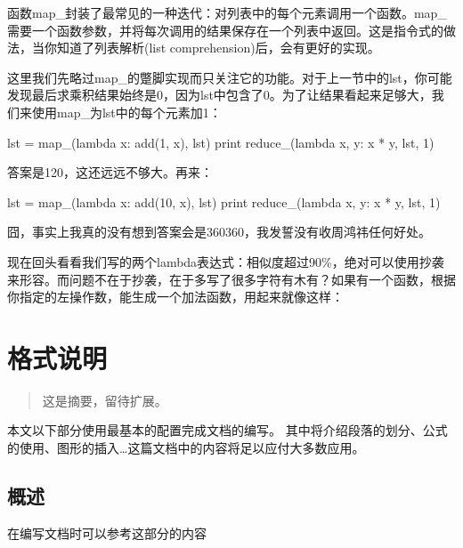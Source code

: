 \documentclass[12pt,a4paper]{report}
\begin{document}
函数map\_封装了最常见的一种迭代：对列表中的每个元素调用一个函数。map\_需要一个函数参数，并将每次调用的结果保存在一个列表中返回。这是指令式的做法，当你知道了列表解析(list comprehension)后，会有更好的实现。

这里我们先略过map\_的蹩脚实现而只关注它的功能。对于上一节中的lst，你可能发现最后求乘积结果始终是0，因为lst中包含了0。为了让结果看起来足够大，我们来使用map\_为lst中的每个元素加1：
\begin{python}[moreemph={[4]42},caption={},label=ex1]
lst = map_(lambda x: add(1, x), lst)
print reduce_(lambda x, y: x * y, lst, 1)
\end{python}

答案是120，这还远远不够大。再来：
\begin{python}[moreemph={[4]42},caption={},label=ex1]
lst = map_(lambda x: add(10, x), lst)
print reduce_(lambda x, y: x * y, lst, 1)
\end{python}

囧，事实上我真的没有想到答案会是360360，我发誓没有收周鸿祎任何好处。

现在回头看看我们写的两个lambda表达式：相似度超过90\%，绝对可以使用抄袭来形容。而问题不在于抄袭，在于多写了很多字符有木有？如果有一个函数，根据你指定的左操作数，能生成一个加法函数，用起来就像这样： 
\begin{python}[moreemph={[4]42},caption={},label=ex1]
\end{python}

\begin{python}[moreemph={[4]42},caption={},label=ex1]
\end{python}

\begin{python}[moreemph={[4]42},caption={},label=ex1]
\end{python}

\chapter{格式说明}

\begin{abstract}
这是摘要，留待扩展。
\end{abstract}

本文以下部分使用\LaTeXe{}最基本的配置完成文档的编写。 其中将介绍段落的划分、公式的使用、图形的插入\ldots 这篇文档中的内容将足以应付大多数应用。
\section{概述}
在编写文档时可以参考这部分的内容
\newpage
\end{document}
